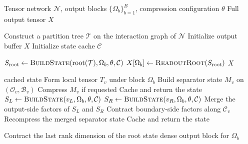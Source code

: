 \begin{algorithm}[t]
\caption{Full-materialization pipeline of \method{}}
\label{alg:astnc}
\begin{algorithmic}[1]
\Require Tensor network $\mathcal N$, output blocks $\{\Omega_b\}_{b=1}^B$, compression configuration $\theta$
\Ensure Full output tensor $X$

\State Construct a partition tree $\mathcal T$ on the interaction graph of $\mathcal N$
\State Initialize output buffer $X$
\State Initialize state cache $\mathcal C$

    \State $S_{\mathrm{root}} \gets \textsc{BuildState}(\mathrm{root}(\mathcal T), \Omega_b, \theta, \mathcal C)$
    \State $X[\Omega_b] \gets \textsc{ReadoutRoot}(S_{\mathrm{root}})$
\EndFor
\State \Return $X$

\vspace{0.4em}
        \State \Return cached state
    \EndIf
        \State Form local tensor $T_v$ under block $\Omega_b$
        \State Build separator state $M_v$ on $(\mathcal O_v,\mathcal B_v)$
        \State Compress $M_v$ if requested
        \State Cache and return the state
    \Else
        \State $S_L \gets \textsc{BuildState}(v_L,\Omega_b,\theta,\mathcal C)$
        \State $S_R \gets \textsc{BuildState}(v_R,\Omega_b,\theta,\mathcal C)$
        \State Merge the output-side factors of $S_L$ and $S_R$
        \State Contract boundary-side factors along $\mathcal C_v$
        \State Recompress the merged separator state
        \State Cache and return the state
    \EndIf
\EndFunction

\vspace{0.4em}
    \State Contract the last rank dimension of the root state
    \State \Return dense output block for $\Omega_b$
\EndFunction
\end{algorithmic}
\end{algorithm}
